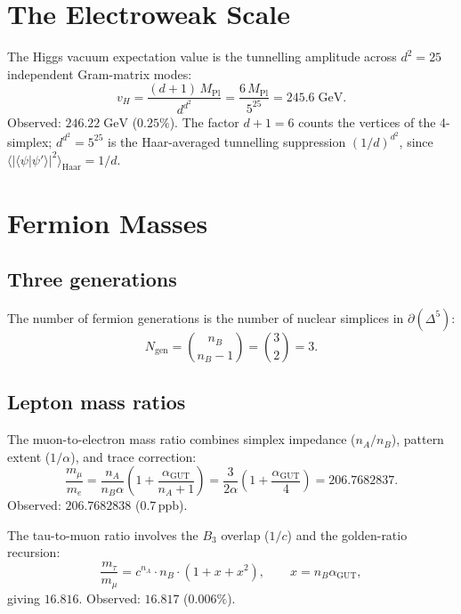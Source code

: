 \documentclass[12pt]{article}
\theoremstyle{definition}
\theoremstyle{remark}
\newcommand{\agut}{\alpha_{\mathrm{GUT}}}
\begin{document}
\section{The Electroweak Scale}
\label{sec:ew}

The Higgs vacuum expectation value is the
tunnelling amplitude across
$d^2 = 25$ independent Gram-matrix modes:
\begin{equation}
v_H = \frac{(d+1)\, M_{\mathrm{Pl}}}{d^{d^2}}
= \frac{6\, M_{\mathrm{Pl}}}{5^{25}}
= 245.6 \;\mathrm{GeV}.
\end{equation}
Observed: $246.22\;\mathrm{GeV}$ ($0.25\%$).
The factor $d + 1 = 6$ counts the vertices
of the 4-simplex; $d^{d^2} = 5^{25}$ is
the Haar-averaged tunnelling suppression
$(1/d)^{d^2}$, since
$\langle |\langle\psi|\psi'\rangle|^2
\rangle_{\mathrm{Haar}} = 1/d$.

\section{Fermion Masses}
\label{sec:masses}

\subsection{Three generations}

The number of fermion generations
is the number of nuclear simplices
in $\partial(\Delta^5)$:
\begin{equation}
N_{\mathrm{gen}}
= \binom{n_B}{n_B - 1} = \binom{3}{2} = 3.
\end{equation}

\subsection{Lepton mass ratios}

The muon-to-electron mass ratio
combines simplex impedance ($n_A/n_B$),
pattern extent ($1/\alpha$), and trace correction:
\begin{equation}
\frac{m_\mu}{m_e}
= \frac{n_A}{n_B \alpha}
  \left(1 + \frac{\agut}{n_A + 1}\right)
= \frac{3}{2\alpha}
  \left(1 + \frac{\agut}{4}\right)
= 206.7682837.
\end{equation}
Observed: $206.7682838$ ($0.7\,\text{ppb}$).

The tau-to-muon ratio involves the
$B_3$ overlap ($1/c$) and the golden-ratio
recursion:
\begin{equation}
\frac{m_\tau}{m_\mu}
= c^{n_A} \cdot n_B
  \cdot (1 + x + x^2),
\qquad x = n_B \agut,
\end{equation}
giving $16.816$.
Observed: $16.817$ ($0.006\%$).
\end{document}
